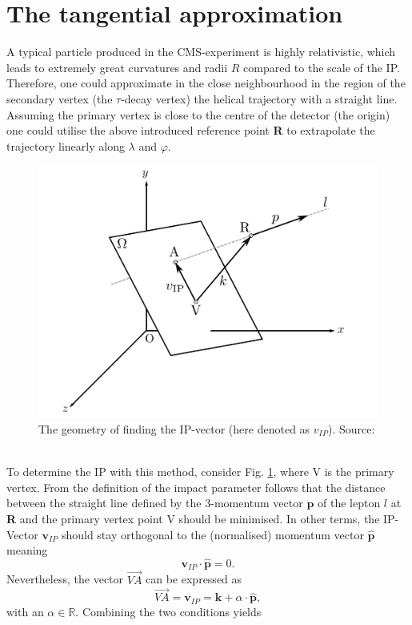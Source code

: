 \section{The tangential approximation}
A typical particle produced in the CMS-experiment is highly relativistic, which leads to extremely great curvatures and radii $R$ compared to the scale of the IP. Therefore, one could approximate in the close neighbourhood in the region of the secondary vertex (the $\tau$-decay vertex) the helical trajectory with a straight line. Assuming the primary vertex is close to the centre of the detector (the origin) one could utilise the above introduced reference point \textbf{R} to extrapolate the trajectory linearly along $\lambda$ and $\varphi$.\\
\begin{figure}[h]
	\centering
	\includegraphics[width=0.5\linewidth]{Figures/IP_tangential}
	\caption{The geometry of finding the IP-vector (here denoted as $v_{IP}$). Source: \parencite{Claudia_thesis}}
	\label{fig:iptangential}
\end{figure}\\
To determine the IP with this method, consider Fig. \ref{fig:iptangential}, where V is the primary vertex. From the definition of the impact parameter follows that the distance between the straight line defined by the 3-momentum vector $\boldsymbol{p}$ of the lepton $l$ at \textbf{R} and the primary vertex point V should be minimised. In other terms, the IP-Vector $\boldsymbol{v}_{IP}$ should stay orthogonal to the (normalised) momentum vector $\boldsymbol{\hat{p}}$ meaning
\begin{equation}
	\boldsymbol{v}_{IP} \cdot \boldsymbol{\hat{p}} = 0.
\end{equation}
Nevertheless, the vector $\overrightarrow{VA}$ can be expressed as
\begin{equation}
	\overrightarrow{VA} = \boldsymbol{v}_{IP} = \boldsymbol{k}+\alpha \cdot \boldsymbol{\hat{p}},
\end{equation}
with an $\alpha \in \mathbb{R}$. Combining the two conditions yields
